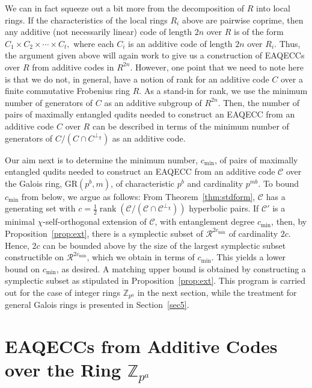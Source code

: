 \documentclass{article}
\DeclareMathOperator{\rank}{rank}
\theoremstyle{remark}
\theoremstyle{definition}
\numberwithin{equation}{section}
\begin{document}
 We can in fact squeeze out a bit more from the decomposition of $R$ into local rings. If the characteristics of the local rings $R_i$ above are pairwise coprime, then any additive (not necessarily linear) code of length $2n$ over $R$ is of the form $C_1\times C_2 \times \cdots \times C_t,$ where each $C_i$ is an additive code of length $2n$ over $R_i$. Thus, the argument given above will again work to give us a construction of EAQECCs over $R$ from additive codes in $R^{2n}$. However, one point that we need to note here is that we do not, in general, have a notion of rank for an additive code $C$ over a finite commutative Frobenius ring $R$. As a stand-in for rank, we use the minimum number of generators of $C$ as an additive subgroup of $R^{2n}$. Then, the number of pairs of maximally entangled qudits needed to construct an EAQECC from an additive code $C$ over $R$ can be described in terms of the minimum number of generators of $C/(C \cap C^{\perp_\chi})$  as an additive code.


\bigskip

Our aim next is to determine the minimum number, $c_{\min}$, of pairs of maximally entangled qudits needed to construct an EAQECC from an additive code $\mathcal{C}$ over the Galois ring, $\text{GR}(p^b,m)$, of characteristic $p^b$ and cardinality $p^{mb}$. To bound $c_{\min}$ from below, we argue as follows: From Theorem~\ref{thm:stdform}, $\mathcal{C}$ has a generating set with $c = \frac12 \rank(\mathcal{C}/(\mathcal{C} \cap \mathcal{C}^{\perp_\chi}))$ hyperbolic pairs. If $\mathcal{C}'$ is a minimal $\chi$-self-orthogonal extension of $\mathcal{C}$, with entanglement degree $c_{\min}$, then, by Proposition~\ref{prop:ext}, there is a symplectic subset of $\mathcal{R}^{2c_{\min}}$ of cardinality $2c$. Hence, $2c$ can be bounded above by the size of the largest symplectic subset constructible on $\mathcal{R}^{2c_{\min}}$, which we obtain in terms of $c_{\min}$. This yields a lower bound on $c_{\min}$, as desired. A matching upper bound is obtained by constructing a symplectic subset as stipulated in Proposition~\ref{prop:ext}. This program is carried out for the case of integer rings $\mathbb{Z}_{p^a}$ in the next section, while the treatment for general Galois rings is presented in Section~\ref{sec5}.

\section{EAQECCs from Additive Codes over the Ring $\mathbb{Z}_{p^a}$} \label{sec4}
\end{document}
